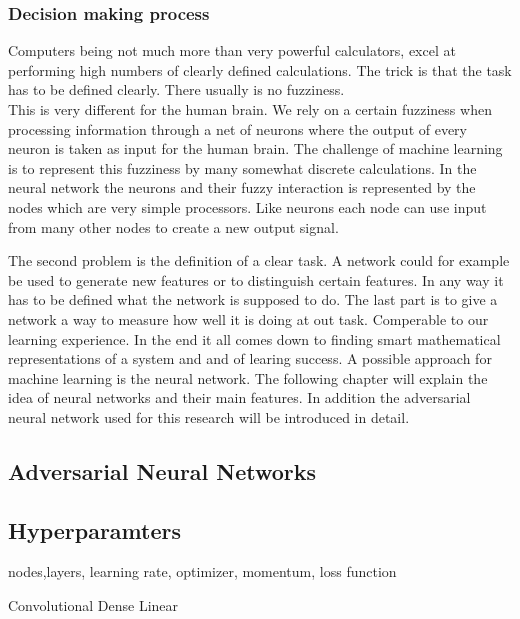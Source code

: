\subsubsection{Decision making process}

Computers being not much more than very powerful calculators, excel at performing high numbers of clearly defined calculations. The trick is that the task has to be defined clearly. There usually is no fuzziness.\\
This is very different for the human brain. We rely on a certain fuzziness when processing information through a net of neurons where the output of every neuron is taken as input for the human brain. The challenge of machine learning is to represent this fuzziness by many somewhat discrete calculations. In the neural network the neurons and their fuzzy interaction is represented by the nodes which are very simple processors. Like neurons each node can use input from many other nodes to create a new output signal.


The second problem is the definition of a clear task. A network could for example be used to generate new features or to distinguish certain features. In any way it has to be defined what the network is supposed to do.
The last part is to give a network a way to measure how well it is doing at out task. Comperable to our learning experience.
In the end it all comes down to finding smart mathematical representations of a system and and of learing success.
A possible approach for machine learning is the neural network. The following chapter will explain the idea of neural networks and their main features. In addition the adversarial neural network used for this research will be introduced in detail. 

\subsection{Adversarial Neural Networks}

\subsection{Hyperparamters}

nodes,layers, learning rate, optimizer, momentum, loss function

Convolutional Dense Linear

